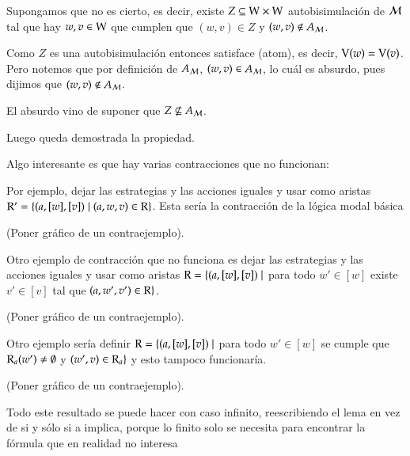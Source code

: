\begin{demostracion}
\begin{enumerate}
        Supongamos que no es cierto, es decir, existe $Z \subseteq \mathrm{W} \times \mathrm{W}$ autobisimulación de $\mathcal{M}$ tal que hay $w,v \in \mathrm{W}$ que cumplen que $(w,v) \in Z$ y $(w,v) \notin A_{\mathcal{M}}$. 

        Como $Z$ es una autobisimulación entonces satisface (atom), es decir, $\mathrm{V}(w) = \mathrm{V}(v)$. Pero notemos que por definición de $A_{\mathcal{M}}$, $(w,v) \in A_{\mathcal{M}}$, lo cuál es absurdo, pues dijimos que $(w,v) \notin A_{\mathcal{M}}$.

        El absurdo vino de suponer que $Z \nsubseteq A_{\mathcal{M}}$.

        Luego queda demostrada la propiedad.

        
    \end{enumerate}
\end{demostracion}



Algo interesante es que hay varias contracciones que no funcionan:

Por ejemplo, dejar las estrategias y las acciones iguales y usar como aristas $\mathrm{R}' = \{(a,[w],[v]) \mid (a,w,v)\in \mathrm{R}\}$. Esta sería la contracción de la lógica modal básica

(Poner gráfico de un contraejemplo).

Otro ejemplo de contracción que no funciona es dejar las estrategias y las acciones iguales y usar como aristas $\mathrm{R} = \{(a,[w],[v]) \mid$ para todo $w' \in [w]$ existe $v' \in [v]$ tal que $(a,w',v') \in \mathrm{R}\}$.

(Poner gráfico de un contraejemplo).

Otro ejemplo sería definir $\mathrm{R} = \{(a,[w],[v]) \mid$ para todo $w' \in [w]$ se cumple que $\mathrm{R}_a(w') \neq \emptyset$ y $(w',v) \in \mathrm{R}_a \}$ y esto tampoco funcionaría.  

(Poner gráfico de un contraejemplo).

Todo este resultado se puede hacer con caso infinito, reescribiendo el lema en vez de si y sólo si a implica, porque lo finito solo se necesita para encontrar la fórmula que en realidad no interesa



